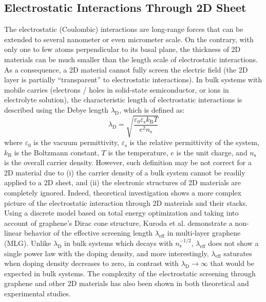 \subsection{Electrostatic Interactions Through 2D Sheet}
\label{sec:electr-inter-thro}

The electrostatic (Coulombic) interactions are long-range forces that
can be extended to several nano\-meter or even micro\-meter scale.
%
On the contrary, with only one to few atoms perpendicular to its basal
plane, the thickness of 2D materials can be much smaller than the
length scale of electrostatic interactions.
%
As a consequence, a 2D material cannot fully screen the electric field
(\ie the 2D layer is partially ``transparent'' to electrostatic
interactions).
%
In bulk systems with mobile carries (electrons / holes in solid-state
semiconductor, or ions in electrolyte solution), the characteristic
length of electrostatic interactions is described using the Debye
length $\lambda_{\mathrm{D}}$, which is defined as:
\begin{equation}
  \label{eq:intro-debye}
  \lambda_{\mathrm{D}} = {\displaystyle \sqrt{
      \frac{\varepsilon_{0} \varepsilon_{\mathrm{s}} k_{\mathrm{B}} T}
      {e^{2} n_{\mathrm{s}}}
    }}
\end{equation}
where $\varepsilon_{0}$ is the vacuum permittivity,
$\varepsilon_{\mathrm{s}}$ is the relative permittivity of the system,
$k_{\mathrm{B}}$ is the Boltzmann constant, $T$ is the temperature,
$e$ is the unit charge, and $n_{\mathrm{s}}$ is the overall carrier
density.
%
However, such definition may be not correct for a 2D material due to
(i) the carrier density of a bulk system cannot be readily applied to
a 2D sheet, and (ii) the electronic structures of 2D materials are
completely ignored.
%
Indeed, theoretical investigation shows a more complex picture of the
electrostatic interaction through 2D materials and their stacks.
%
Using a discrete model based on total energy optimization and taking
into account of graphene's Dirac cone structure, Kuroda et
al. demonstrate a non-linear behavior of the effective screening
length $\lambda_{\mathrm{eff}}$ in multi-layer graphene
(MLG). 
%
Unlike $\lambda_{\mathrm{D}}$ in bulk systems which decays with
$n_{\mathrm{s}}^{-1/2}$, $\lambda_{\mathrm{eff}}$ does not show a
single power law with the doping density, and more interestingly,
$\lambda_{\mathrm{eff}}$ saturates when doping density decreases to
zero, in contrast with $\lambda_{\mathrm{D}} \to \infty$ that would be
expected in bulk systems.
%
The complexity of the electrostatic screening through graphene and
other 2D materials has also been shown in both theoretical and
experimental studies.  
%

